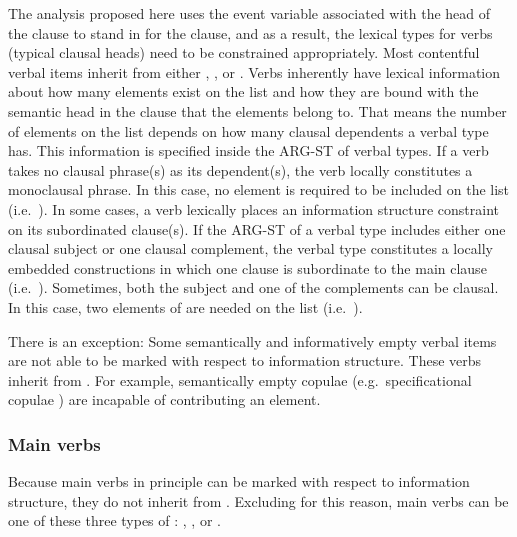 The analysis proposed here uses the event variable associated with the
head of the clause to stand in for the clause, and as a result, the
lexical types for verbs (typical clausal heads) need to be constrained
appropriately.  Most contentful verbal items inherit from either
, , or
.  Verbs inherently have lexical information
about how many elements exist on the  list and how they are
bound with the semantic head in the clause that the elements belong
to. That means the number of elements on the  list depends
on how many clausal dependents a verbal type has.  This information is
specified inside the ARG-ST of verbal types.  If a verb takes no
clausal phrase(s) as its dependent(s), the verb locally constitutes a
monoclausal phrase. In this case, no element is required to be
included on the  list (i.e.\ ).
In some cases, a verb lexically places an information structure
constraint on its subordinated clause(s).  If the ARG-ST of a verbal
type includes either one clausal subject or one clausal complement,
the verbal type constitutes a locally embedded constructions in which
one clause is subordinate to the main clause
(i.e.\ ). Sometimes, both the subject and one
of the complements can be clausal. In this case, two elements of
 are needed on the  list
(i.e.\ ).



There is an exception: Some semantically and informatively empty
verbal items are not able to be marked with respect to information
structure. These verbs inherit from . For
example, semantically empty copulae (e.g.\ specificational copulae
) are incapable of contributing an 
element.



\subsubsection{Main verbs}
\label{10:sssec:main-verbs}

Because main verbs in principle can be marked with respect to
information structure, they do not inherit from
. Excluding  for this
reason, main verbs can be one of these three types of
: ,
, or .


